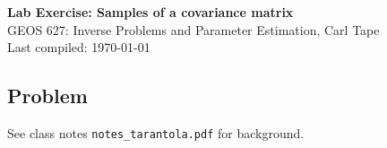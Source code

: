 \documentclass[11pt,titlepage,fleqn]{article}
\begin{document}

\begin{spacing}{1.2}
\begin{center}
{\large \bf Lab Exercise: Samples of a covariance matrix} \\
GEOS 627: Inverse Problems and Parameter Estimation, Carl Tape \\
Last compiled: \today
\end{center}
\end{spacing}


\subsection*{Problem}

See class notes \verb+notes_tarantola.pdf+ for background.
\end{document}
